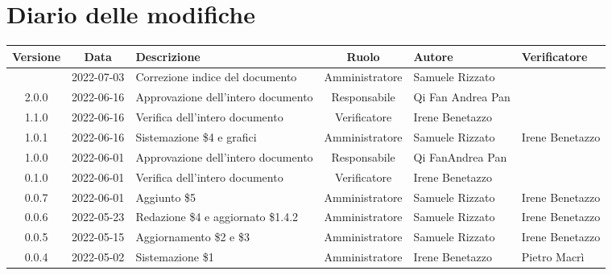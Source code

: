 \section*{Diario delle modifiche}
	\begin{center}
	\renewcommand{\arraystretch}{1.8} %
	\begin{longtable}{ |c|c|p{8em}|c|m{5em}|m{6em}| }
		\hline
		\textbf{Versione} & \textbf{Data} & \textbf{Descrizione} &  \textbf{Ruolo} &  \textbf{Autore} & \textbf{Verificatore} \\
		\hline
		 & 2022-07-03 & Correzione indice del documento & Amministratore & Samuele \newline Rizzato & \\
		\hline
		2.0.0 & 2022-06-16 & Approvazione dell'intero documento & Responsabile & Qi Fan \newline Andrea Pan & \\
		\hline
		1.1.0 & 2022-06-16 & Verifica dell'intero documento & Verificatore & Irene \newline Benetazzo & \\
		\hline
		1.0.1 & 2022-06-16 & Sistemazione \$4 e grafici & Amministratore & Samuele \newline Rizzato & Irene \newline Benetazzo \\
		\hline
		1.0.0 & 2022-06-01 & Approvazione dell'intero documento & Responsabile &Qi Fan\newline Andrea Pan & \\
		\hline
		0.1.0 & 2022-06-01 & Verifica dell'intero documento & Verificatore &Irene \newline Benetazzo & \\
		\hline
		0.0.7 & 2022-06-01 & Aggiunto \$5 & Amministratore & Samuele \newline Rizzato & Irene \newline Benetazzo \\
		\hline
		0.0.6 & 2022-05-23 & Redazione \$4 e aggiornato \$1.4.2 & Amministratore & Samuele \newline Rizzato & Irene \newline Benetazzo \\
		\hline
		0.0.5 & 2022-05-15 & Aggiornamento \$2 e \$3 & Amministratore & Samuele \newline Rizzato & Irene \newline Benetazzo \\
		\hline
		0.0.4 & 2022-05-02 & Sistemazione \$1 & Amministratore & Irene \newline Benetazzo & Pietro \newline Macrì\\

\end{longtable}
\end{center}
